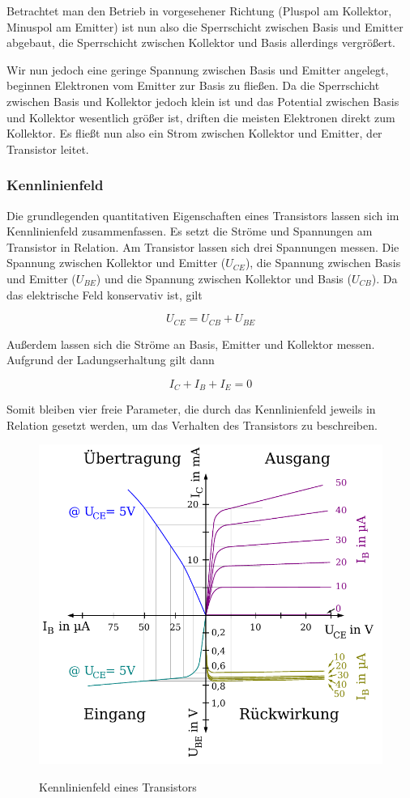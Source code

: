 \documentclass[a4paper,german,12pt,smallheadings]{scrartcl}
\begin{document}
Betrachtet man den Betrieb in vorgesehener Richtung (Pluspol am Kollektor,
Minuspol am Emitter) ist nun also die Sperrschicht zwischen Basis und Emitter
abgebaut, die Sperrschicht zwischen Kollektor und Basis allerdings vergrößert.

Wir nun jedoch eine geringe Spannung zwischen Basis und Emitter angelegt,
beginnen Elektronen vom Emitter zur Basis zu fließen. Da die Sperrschicht
zwischen Basis und Kollektor jedoch klein ist und das Potential zwischen Basis
und Kollektor wesentlich größer ist, driften die meisten Elektronen direkt zum
Kollektor. Es fließt nun also ein Strom zwischen Kollektor und Emitter, der
Transistor leitet.

\subsubsection{Kennlinienfeld}

Die grundlegenden quantitativen Eigenschaften eines Transistors lassen sich im
Kennlinienfeld zusammenfassen. Es setzt die Ströme und Spannungen am Transistor
in Relation. Am Transistor lassen sich drei Spannungen messen. Die Spannung
zwischen Kollektor und Emitter ($U_{CE}$), die Spannung zwischen Basis und
Emitter ($U_{BE}$) und die Spannung zwischen Kollektor und Basis ($U_{CB}$). Da
das elektrische Feld konservativ ist, gilt

\begin{equation}
  U_{CE} = U_{CB} + U_{BE}
\end{equation}

Außerdem lassen sich die Ströme an Basis, Emitter und Kollektor messen.
Aufgrund der Ladungserhaltung gilt dann

\begin{equation}
  I_C + I_B + I_E = 0
\end{equation}

Somit bleiben vier freie Parameter, die durch das Kennlinienfeld jeweils in
Relation gesetzt werden, um das Verhalten des Transistors zu beschreiben.

\begin{figure}[H]
  \centering
  \includegraphics[width=.6\textwidth]{kennlinienfeld.pdf}
  \label{img:kennlinie}
  \caption{Kennlinienfeld eines Transistors}
\end{figure}
\end{document}

